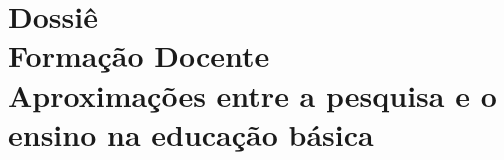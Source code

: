 

\mainmatter

\part[Dossiê: Formação docente: \itshape{aproximações entre a pesquisa e o ensino na educação básica}]{{\normalsize Dossiê}\\
Formação Docente\\
\textup{Aproximações entre a pesquisa e o ensino na educação básica}
}














% 


% 
% 
% 
% 


% 


% 

\backmatter





